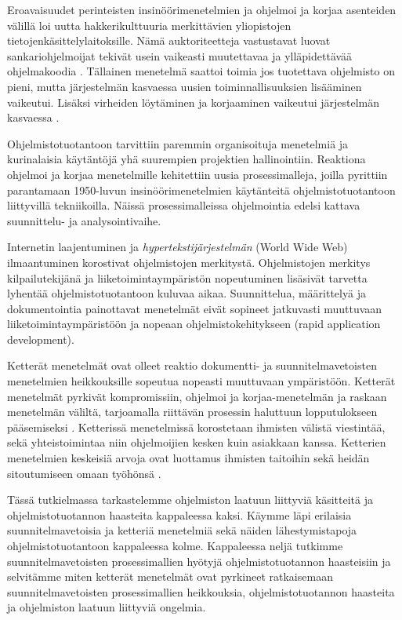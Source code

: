 \documentclass[finnish]{tktltiki2}
\theoremstyle{definition}
\theoremstyle{remark}
\begin{document}
Eroavaisuudet perinteisten insinöörimenetelmien ja ohjelmoi ja korjaa asenteiden välillä loi uutta hakkerikulttuuria merkittävien yliopistojen tietojenkäsittelylaitoksille. Nämä auktoriteetteja vastustavat luovat sankariohjelmoijat tekivät usein vaikeasti muutettavaa ja ylläpidettävää ohjelmakoodia \cite{BOE06}. Tällainen menetelmä saattoi toimia jos tuotettava ohjelmisto on pieni, mutta järjestelmän kasvaessa uusien toiminnallisuuksien lisääminen vaikeutui. Lisäksi virheiden löytäminen ja korjaaminen vaikeutui järjestelmän kasvaessa \cite{FOW01a}.

Ohjelmistotuotantoon tarvittiin paremmin organisoituja menetelmiä ja kurinalaisia käytäntöjä yhä suurempien projektien hallinointiin. Reaktiona ohjelmoi ja korjaa menetelmille kehitettiin uusia prosessimalleja, joilla pyrittiin parantamaan 1950-luvun insinöörimenetelmien käytänteitä ohjelmistotuotantoon liittyvillä tekniikoilla. Näissä prosessimalleissa ohjelmointia edelsi kattava suunnittelu- ja analysointivaihe\cite{BOE06}.

Internetin laajentuminen ja \textit{hypertekstijärjestelmän} (World Wide Web) ilmaantuminen korostivat ohjelmistojen merkitystä. Ohjelmistojen merkitys kilpailutekijänä ja liiketoimintaympäristön nopeutuminen lisäsivät tarvetta lyhentää ohjelmistotuotantoon kuluvaa aikaa. Suunnittelua, määrittelyä ja dokumentointia painottavat menetelmät eivät sopineet jatkuvasti muuttuvaan liiketoimintaympäristöön ja nopeaan ohjelmistokehitykseen (rapid application development)\cite{BOE06}.

Ketterät menetelmät ovat olleet reaktio dokumentti- ja suunnitelmavetoisten menetelmien heikkouksille sopeutua nopeasti muuttuvaan ympäristöön. Ketterät menetelmät pyrkivät kompromissiin, ohjelmoi ja korjaa-menetelmän ja raskaan menetelmän väliltä, tarjoamalla riittävän prosessin haluttuun lopputulokseen pääsemiseksi \cite{FOW01a}. Ketterissä menetelmissä korostetaan ihmisten välistä viestintää, sekä yhteistoimintaa niin ohjelmoijien kesken kuin asiakkaan kanssa. Ketterien menetelmien keskeisiä arvoja ovat luottamus ihmisten taitoihin sekä heidän sitoutumiseen omaan työhönsä \cite{COH01}.

Tässä tutkielmassa tarkastelemme ohjelmiston laatuun liittyviä käsitteitä ja ohjelmistotuotannon haasteita kappaleessa kaksi. Käymme läpi erilaisia suunnitelmavetoisia ja ketteriä menetelmiä sekä näiden lähestymistapoja ohjelmistotuotantoon kappaleessa kolme. Kappaleessa neljä tutkimme suunnitelmavetoisten 
prosessimallien hyötyjä ohjelmistotuotannon haasteisiin ja selvitämme miten ketterät menetelmät ovat pyrkineet ratkaisemaan suunnitelmavetoisten prosessimallien heikkouksia, ohjelmistotuotannon haasteita ja ohjelmiston laatuun liittyviä ongelmia.
\end{document}
